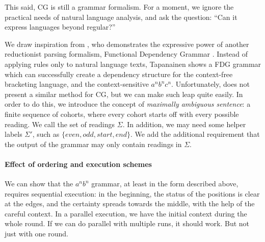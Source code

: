 {This said, CG is still a grammar formalism. For a moment, we ignore the practical needs of natural language analysis, and ask the question: ``Can it express languages beyond regular?'' 

We draw inspiration from \cite{tapanainen1999phd}, who demonstrates the expressive power of another reductionist parsing formalism, Functional Dependency Grammar .
Instead of applying rules only to natural language texts, Tapanainen shows a FDG grammar which can successfully create a dependency structure for the context-free bracketing language, and the context-sensitive $a^nb^nc^n$. 
Unfortunately, \cite{tapanainen1999phd} does not present a similar method for CG, but we can make such leap quite easily. In order to do this, we introduce the concept of \emph{maximally ambiguous sentence}: a finite sequence of cohorts, where every cohort starts off with every possible reading. We call the set of readings $\Sigma$. In addition, we may need some helper labels $\Sigma'$, such as $\{even, odd, start, end\}$. We add the additional requirement that the output of the grammar may only contain readings in $\Sigma$.





\paragraph{Effect of ordering and execution schemes}

We can show that the $a^nb^n$ grammar, at least in the form described above,
requires sequential execution: in the beginning, the status of the positions is 
clear at the edges, and the certainty spreads towards the middle, with the help of
the careful context.
In a parallel execution, we have the initial context during the whole round.
If we can do parallel with multiple runs, it should work. But not just with one round.

}
